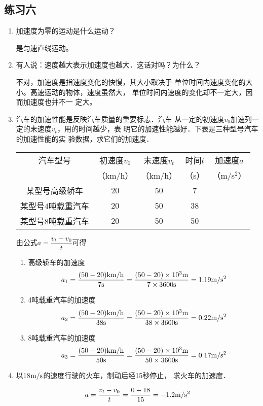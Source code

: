\subsection{练习六}
\begin{enumerate}
\item  加速度为零的运动是什么运动？
   

\begin{solution}
    是匀速直线运动。
\end{solution}
\item  有人说：速度越大表示加速度也越大．这话对吗？为什么？   

\begin{solution}
    不对，加速度是指速度变化的快慢，其大小取决于
    单位时间内速度变化的大小。高速运动的物体，速度虽然大，
    单位时间内速度的变化却不一定大，因而加速度也并不一
    定大。
\end{solution}
\item  汽车的加速性能是反映汽车质量的重要标志．汽车
从一定的初速度$v_0$加速列一定的末速度$v_t$，用的时间越少，表
明它的加速性能越好．下表是三种型号汽车的加速性能的实
验数据，求它们的加速度．

\begin{center}
\begin{tabular}{ccccc}
\hline
汽车型号 & 初速度$v_0$ & 末速度$v_t$ & 时间$t$ & 加速度$a$\\
& （km/h）& （km/h）& （s）& （m/s$^2$）\\
\hline
某型号高级轿车& 20& 50& 7 \\
某型号4吨载重汽车& 20& 50& 38\\
某型号8吨载重汽车& 20& 50& 50\\
\hline
\end{tabular}
\end{center}
   
\begin{solution}
    由公式$a=\dfrac{v_t-v_0}{t}$可得
\begin{enumerate}
    \item 高级轿车的加速度
    \[a_1=\frac{(50-20)\text{km}/\text{h}}{7{\rm s}}=\frac{(50-20)\times 10^3{\rm m}}{7\times 3600{\rm s}}=1.19\text{m}/\text{s}^2\]
    \item 4吨载重汽车的加速度
    \[a_2=\frac{(50-20)\text{km}/\text{h}}{38{\rm s}}=\frac{(50-20)\times 10^3{\rm m}}{38\times 3600{\rm s}}=0.22\text{m}/\text{s}^2\]
    \item 8吨载重汽车的加速度
    \[a_3=\frac{(50-20)\text{km}/\text{h}}{50{\rm s}}=\frac{(50-20)\times 10^3{\rm m}}{50\times 3600{\rm s}}=0.17\text{m}/\text{s}^2\]
\end{enumerate}
\end{solution}
\item   以18$\text{m}/\text{s}$的速度行驶的火车，制动后经15秒停止，
求火车的加速度．
   

\begin{solution}
   \[a=\dfrac{v_t-v_0}{t}=\frac{0-18}{15}=-1.2\text{m}/\text{s}^2\]
\end{solution}
\end{enumerate}


